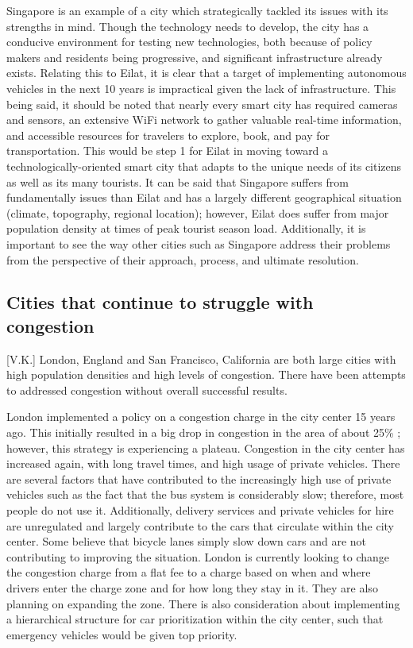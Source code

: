 \documentclass[12pt]{article}                       %
\begin{document}
Singapore is an example of a city which strategically tackled its issues with its strengths in mind. Though the technology needs to develop, the city has a conducive environment for testing new technologies, both because of policy makers and residents being progressive, and significant infrastructure already exists. Relating this to Eilat, it is clear that a target of implementing autonomous vehicles in the next 10 years is impractical given the lack of infrastructure. This being said, it should be noted that nearly every smart city has required cameras and sensors, an extensive WiFi network to gather valuable real-time information, and accessible resources for travelers to explore, book, and pay for transportation. This would be step 1 for Eilat in moving toward a technologically-oriented smart city that adapts to the unique needs of its citizens as well as its many tourists. It can be said that Singapore suffers from fundamentally issues than Eilat and has a largely different geographical situation (climate, topography, regional location); however, Eilat does suffer from major population density at times of peak tourist season load. Additionally, it is important to see the way other cities such as Singapore address their problems from the perspective of their approach, process, and ultimate resolution.

\subsection{Cities that continue to struggle with congestion}[V.K.]
London, England and San Francisco, California are both large cities with high population densities and high levels of congestion. There have been attempts to addressed congestion without overall successful results. 

London implemented a policy on a congestion charge in the city center 15 years ago. This initially resulted in a big drop in congestion  in the area of about 25\% \cite{Badstuber2018LondonIt}; however,  this strategy is experiencing a plateau. Congestion in the city center has increased again, with long travel times, and high usage of private vehicles. There are several factors that have contributed to the increasingly high use of private vehicles such as the fact that the bus system is considerably slow; therefore, most people do not use it. Additionally, delivery services and private vehicles for hire are unregulated and largely contribute to the cars that circulate within the city center. Some believe that bicycle lanes simply slow down cars and are not contributing to improving the situation. London is currently looking to change the congestion charge from a flat fee to a charge based on when and where drivers enter the charge zone and for how long they stay in it. They are also planning on expanding the zone. There is also consideration about implementing a hierarchical structure for car prioritization within the city center, such that emergency vehicles would be given top priority. 
\end{document}
